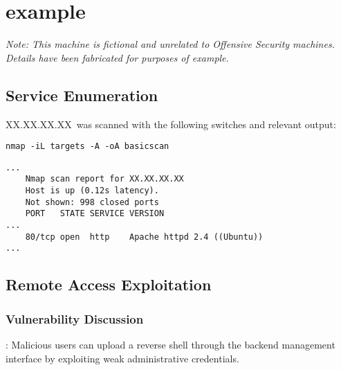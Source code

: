 
\renewcommand{\hostname}{example}
\renewcommand{\os}{Ubuntu 16.04 LTS}
\renewcommand{\ip}{XX.XX.XX.XX}

\renewcommand{\vuln}{}
\renewcommand{\product}{}
\renewcommand{\vulnx}{\vulnPassword}
\renewcommand{\productx}{}
\def\gotroot{}   %

\section{\label{\hostname}\hostname}

\textit{Note: This machine is fictional and unrelated to Offensive Security machines. Details have been fabricated for purposes of example.}

\subsection{Service Enumeration}

\ip\ was scanned with the following switches and relevant output:
\par \texttt{nmap -iL targets -A -oA basicscan}
\begin{lstlisting}
...
	Nmap scan report for XX.XX.XX.XX
	Host is up (0.12s latency).
	Not shown: 998 closed ports
	PORT   STATE SERVICE VERSION
...
	80/tcp open  http    Apache httpd 2.4 ((Ubuntu))
...
\end{lstlisting}



\subsection{Remote Access Exploitation}

\subsubsection{Vulnerability Discussion} 
\vulnPassword: Malicious users can upload a reverse shell through the backend management interface by exploiting weak administrative credentials.

